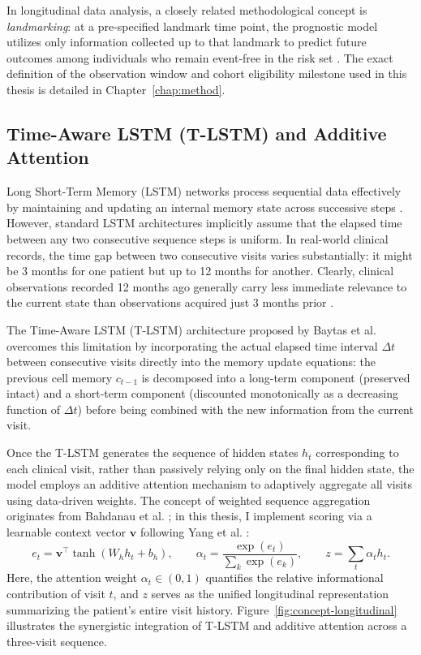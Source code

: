 In longitudinal data analysis, a closely related methodological concept is \emph{landmarking}: at a pre-specified landmark time point, the prognostic model utilizes only information collected up to that landmark to predict future outcomes among individuals who remain event-free in the risk set \cite{vanhouwelingen2007dynamic}. The exact definition of the observation window and cohort eligibility milestone used in this thesis is detailed in Chapter~\ref{chap:method}.

\subsection{Time-Aware LSTM (T-LSTM) and Additive Attention}
\label{sec:background-temporal}
Long Short-Term Memory (LSTM) networks process sequential data effectively by maintaining and updating an internal memory state across successive steps \cite{hochreiter1997lstm}. However, standard LSTM architectures implicitly assume that the elapsed time between any two consecutive sequence steps is uniform. In real-world clinical records, the time gap between two consecutive visits varies substantially: it might be 3 months for one patient but up to 12 months for another. Clearly, clinical observations recorded 12 months ago generally carry less immediate relevance to the current state than observations acquired just 3 months prior \cite{baytas2017patient}.

The Time-Aware LSTM (T-LSTM) architecture proposed by Baytas et al. \cite{baytas2017patient} overcomes this limitation by incorporating the actual elapsed time interval $\Delta t$ between consecutive visits directly into the memory update equations: the previous cell memory $c_{t-1}$ is decomposed into a long-term component (preserved intact) and a short-term component (discounted monotonically as a decreasing function of $\Delta t$) before being combined with the new information from the current visit.

Once the T-LSTM generates the sequence of hidden states $h_t$ corresponding to each clinical visit, rather than passively relying only on the final hidden state, the model employs an additive attention mechanism to adaptively aggregate all visits using data-driven weights. The concept of weighted sequence aggregation originates from Bahdanau et al. \cite{bahdanau2015attention}; in this thesis, I implement scoring via a learnable context vector $\bm v$ following Yang et al. \cite{yang2016hierarchical}:
\begin{equation}
 e_t=\bm v^\top\tanh(W_hh_t+b_h),\qquad
 \alpha_t=\frac{\exp(e_t)}{\sum_k\exp(e_k)},\qquad
 z=\sum_t\alpha_th_t.
 \label{eq:additive-attention}
\end{equation}
Here, the attention weight $\alpha_t \in (0,1)$ quantifies the relative informational contribution of visit $t$, and $z$ serves as the unified longitudinal representation summarizing the patient's entire visit history. Figure~\ref{fig:concept-longitudinal} illustrates the synergistic integration of T-LSTM and additive attention across a three-visit sequence.

